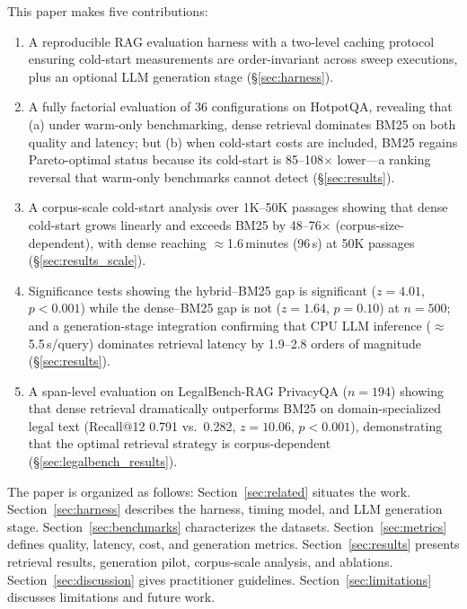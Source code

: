 \documentclass[11pt,a4paper]{article}
\begin{document}
This paper makes five contributions:
\begin{enumerate}[leftmargin=*,topsep=2pt,itemsep=2pt]
  \item A reproducible RAG evaluation harness with a two-level caching
        protocol ensuring cold-start measurements are order-invariant across
        sweep executions, plus an optional LLM generation stage
        (\S\ref{sec:harness}).
  \item A fully factorial evaluation of 36 configurations on HotpotQA,
        revealing that (a) under warm-only benchmarking, dense retrieval
        dominates BM25 on both quality and latency; but (b) when cold-start
        costs are included, BM25 regains Pareto-optimal status because its
        cold-start is 85--108$\times$ lower---a ranking reversal that
        warm-only benchmarks cannot detect (\S\ref{sec:results}).
  \item A corpus-scale cold-start analysis over 1K--50K passages showing that
        dense cold-start grows linearly and exceeds BM25 by 48--76$\times$
        (corpus-size-dependent), with dense reaching $\approx$1.6\,minutes (96\,s)
        at 50K passages
        (\S\ref{sec:results_scale}).
  \item Significance tests showing the hybrid--BM25 gap is significant
        ($z=4.01$, $p<0.001$) while the dense--BM25 gap is not ($z=1.64$,
        $p=0.10$) at $n=500$; and a generation-stage integration confirming
        that CPU LLM inference ($\approx$5.5\,s/query) dominates retrieval
        latency by 1.9--2.8 orders of magnitude (\S\ref{sec:results}).
  \item A span-level evaluation on LegalBench-RAG PrivacyQA ($n=194$)
        showing that dense retrieval dramatically outperforms BM25 on
        domain-specialized legal text (Recall@12 0.791 vs.\ 0.282,
        $z=10.06$, $p<0.001$), demonstrating that the optimal retrieval
        strategy is corpus-dependent (\S\ref{sec:legalbench_results}).
\end{enumerate}

\noindent
The paper is organized as follows:
Section~\ref{sec:related} situates the work.
Section~\ref{sec:harness} describes the harness, timing model, and LLM
generation stage.
Section~\ref{sec:benchmarks} characterizes the datasets.
Section~\ref{sec:metrics} defines quality, latency, cost, and generation
metrics.
Section~\ref{sec:results} presents retrieval results, generation pilot,
corpus-scale analysis, and ablations.
Section~\ref{sec:discussion} gives practitioner guidelines.
Section~\ref{sec:limitations} discusses limitations and future work.
\end{document}
